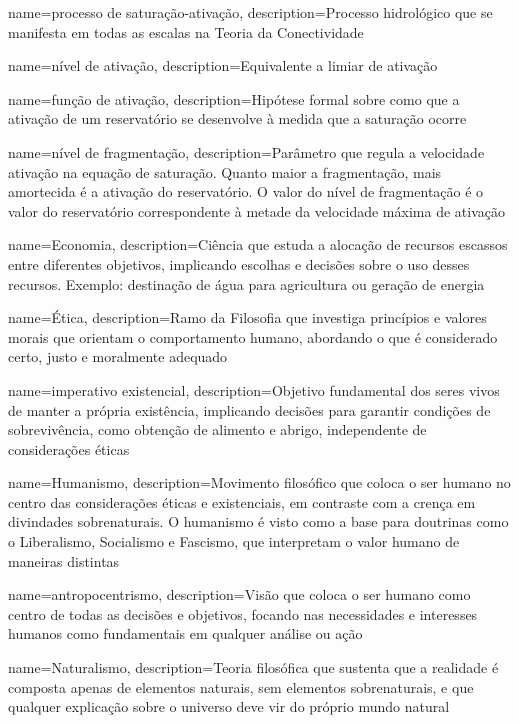 {
    name=processo de saturação-ativação,
    description={Processo hidrológico que se manifesta em todas as escalas na Teoria da Conectividade}
}

{
    name=nível de ativação,
    description={Equivalente a limiar de ativação}
}

{
    name=função de ativação,
    description={Hipótese formal sobre como que a ativação de um reservatório se desenvolve à medida que a saturação ocorre}
}

{
    name=nível de fragmentação,
    description={Parâmetro que regula a velocidade ativação na equação de saturação. Quanto maior a fragmentação, mais amortecida é a ativação do reservatório. O valor do nível de fragmentação é o valor do reservatório correspondente à metade da velocidade máxima de ativação}
}

{
	name=Economia,
	description={Ciência que estuda a alocação de recursos escassos entre diferentes objetivos, implicando escolhas e decisões sobre o uso desses recursos. Exemplo: destinação de água para agricultura ou geração de energia}
}

{
	name=Ética,
	description={Ramo da Filosofia que investiga princípios e valores morais que orientam o comportamento humano, abordando o que é considerado certo, justo e moralmente adequado}
}

{
	name=imperativo existencial,
	description={Objetivo fundamental dos seres vivos de manter a própria existência, implicando decisões para garantir condições de sobrevivência, como obtenção de alimento e abrigo, independente de considerações éticas}
}

{
	name=Humanismo,
	description={Movimento filosófico que coloca o ser humano no centro das considerações éticas e existenciais, em contraste com a crença em divindades sobrenaturais. O humanismo é visto como a base para doutrinas como o Liberalismo, Socialismo e Fascismo, que interpretam o valor humano de maneiras distintas}
}

{
	name=antropocentrismo,
	description={Visão que coloca o ser humano como centro de todas as decisões e objetivos, focando nas necessidades e interesses humanos como fundamentais em qualquer análise ou ação}
}

{
	name=Naturalismo,
	description={Teoria filosófica que sustenta que a realidade é composta apenas de elementos naturais, sem elementos sobrenaturais, e que qualquer explicação sobre o universo deve vir do próprio mundo natural}
}

